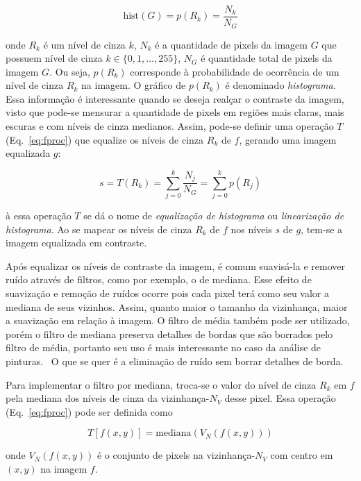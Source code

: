 \begin{equation}
\text{hist}(G) = p(R_k) = \frac{N_k}{N_G}
\end{equation}

\noindent onde $R_k$ é um nível de cinza $k$, $N_k$ é a quantidade de
pixels da imagem $G$ que possuem nível de cinza $k \in \{0, 1, ...,
255\}$, $N_G$ é quantidade total de pixels da imagem $G$. Ou seja,
$p(R_k)$ corresponde à probabilidade de ocorrência de um nível de
cinza $R_k$ na imagem. O gráfico de $p(R_k)$ é denominado
\emph{histograma}. Essa informação é interessante quando se deseja
realçar o contraste da imagem, visto que pode-se mensurar a quantidade
de pixels em regiões mais claras, mais escuras e com níveis de cinza
medianos. Assim, pode-se definir uma operação $T$ (Eq.~\ref{eq:fproc}) que equalize os
níveis de cinza $R_k$ de $f$, gerando uma imagem equalizada $g$:

\begin{equation}
s = T(R_k) = \sum_{j=0}^k \frac{N_j}{N_G} = \sum_{j=0}^k p(R_j)
\end{equation}

\noindent à essa operação $T$ se dá o nome de \emph{equalização de
  histograma} ou \emph{linearização de histograma}. Ao se mapear os
níveis de cinza $R_k$ de $f$ nos níveis $s$ de $g$, tem-se a imagem
equalizada em contraste.

Após equalizar os níveis de contraste da imagem, é comum suavisá-la e
remover ruído através de filtros, como por exemplo, o de mediana. Esse
efeito de suavização e remoção de ruídos ocorre pois cada pixel terá
como seu valor a mediana de seus vizinhos. Assim, quanto maior o
tamanho da vizinhança, maior a suavização em relação à imagem. O
filtro de média também pode ser utilizado, porém o filtro de mediana
preserva detalhes de bordas que são borrados pelo filtro de média,
portanto seu uso é mais interessante no caso da análise de
pinturas.~\cite{gonzalez} O que se quer é a eliminação de ruído sem
borrar detalhes de borda.

Para implementar o filtro por mediana, troca-se o valor do nível de
cinza $R_k$ em $f$ pela mediana dos níveis de cinza da
vizinhança-$N_V$ desse pixel. Essa operação (Eq.~\ref{eq:fproc}) pode
ser definida como

\begin{equation}
  T[f(x,y)] = \text{mediana}(V_N(f(x,y)))
\end{equation}

\noindent onde $V_N(f(x,y))$ é o conjunto de pixels na
vizinhança-$N_V$ com centro em $(x,y)$ na imagem $f$.

